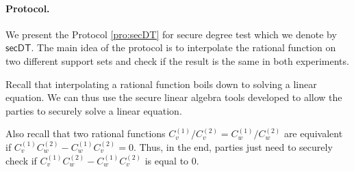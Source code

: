 \begin{center}
\end{center}

\paragraph{Protocol.} We present the Protocol \ref{pro:secDT} for secure degree test which we denote by $\mathsf{secDT}$. The main idea of the protocol is to interpolate the rational function on two different support sets and check if the result is the same in both experiments.

Recall that interpolating a rational function boils down to solving a linear equation. We can thus use the secure linear algebra tools developed to allow the parties to securely solve a linear equation. 

Also recall that two rational functions $C_v^{(1)}/C_v^{(2)}=C_w^{(1)}/C_w^{(2)}$ are equivalent if $C_v^{(1)}C_w^{(2)}-C_w^{(1)} C_v^{(2)}=0$. Thus, in the end, parties just need to securely check if $C_v^{(1)}C_w^{(2)}-C_w^{(1)} C_v^{(2)}$ is equal to $0$.

